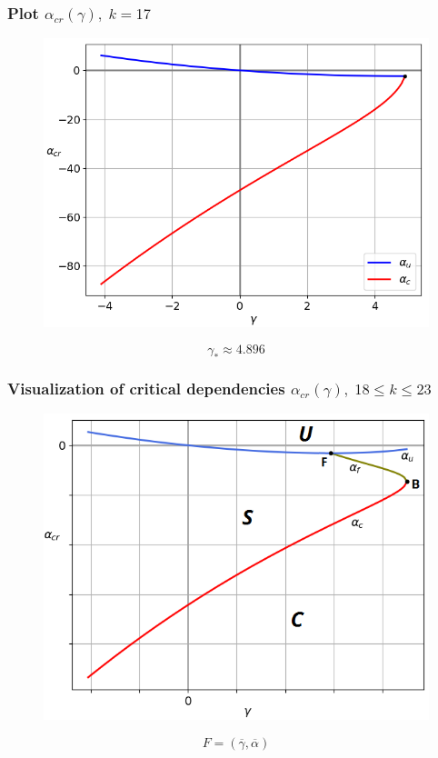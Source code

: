\documentclass[fullscreen=true, unicode, bookmarks=false]{beamer}
\begin{document}
\begin{frame}
\frametitle{ Plot $ \alpha_{cr}(\gamma), \; k = 17 $ }

\begin{figure} 
\includegraphics[scale=0.55]{alphas_033.png}  
\end{figure}
$$ \gamma_* \approx 4.896 $$

\end{frame}

\begin{frame}
\frametitle{ Visualization of critical dependencies $ \alpha_{cr}(\gamma), \; 18 \leqslant k \leqslant 23 $ }

\begin{figure} 
\includegraphics[scale=0.59]{scheme1823.png}  
\end{figure}
$$ F = (\overline{\gamma}, \overline{\alpha}) $$

\end{frame}
\end{document}
